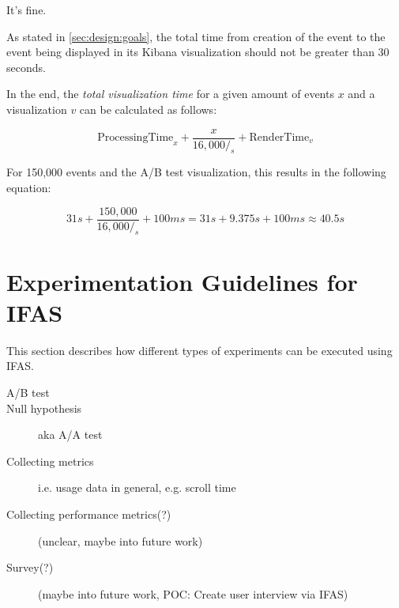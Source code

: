 It's fine.

As stated in \cref{sec:design:goals}, the total time from creation of the event to the event being displayed in its Kibana visualization should not be greater than 30 seconds.

In the end, the \emph{total visualization time} for a given amount of events $x$ and a visualization $v$ can be calculated as follows:

$$ \text{ProcessingTime}_x + \frac{x}{16,000/_s} + \text{RenderTime}_v$$

For 150,000 events and the A/B test visualization, this results in the following equation:

$$ 31s + \frac{150,000}{16,000/_s} + 100ms = 31s + 9.375s + 100ms \approx 40.5s $$


\section{Experimentation Guidelines for IFAS}

This section describes how different types of experiments can be executed using \ac{IFAS}.

\begin{description}
\item[A/B test]
\item[Null hypothesis] aka A/A test \cite{Kohavi2009}
\item[Collecting metrics] i.e. usage data in general, e.g. scroll time
\item[Collecting performance metrics(?)] (unclear, maybe into future work)
\item[Survey(?)] (maybe into future work, POC: Create user interview via \ac{IFAS})
\end{description}

